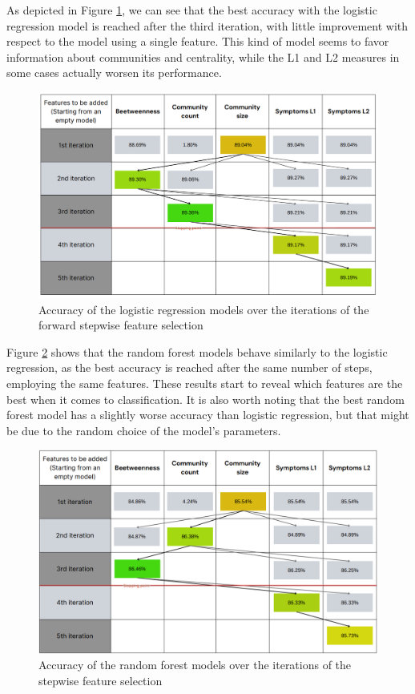 As depicted in Figure \ref{fig:stepwise_acc_logreg}, we can see that the best accuracy with the logistic regression model is reached after the third iteration, with little improvement with respect to the model using a single feature. This kind of model seems to favor information about communities and centrality, while the L1 and L2 measures in some cases actually worsen its performance.
\begin{figure}[H]
	\centering
	\includegraphics[width=\columnwidth]{images/stepwise_acc_logreg.png}
	\caption{Accuracy of the logistic regression models over the iterations of the forward stepwise feature selection}
	\label{fig:stepwise_acc_logreg}
\end{figure}

Figure \ref{fig:stepwise_acc_randomforest} shows that the random forest models behave similarly to the logistic regression, as the best accuracy is reached after the same number of steps, employing the same features. These results start to reveal which features are the best when it comes to classification. It is also worth noting that the best random forest model has a slightly worse accuracy than logistic regression, but that might be due to the random choice of the model's parameters.

\begin{figure}[H]
	\centering
	\includegraphics[width=\columnwidth]{images/stepwise_acc_randomforest.png}
	\caption{Accuracy of the random forest models over the iterations of the stepwise feature selection}
	\label{fig:stepwise_acc_randomforest}
\end{figure}

